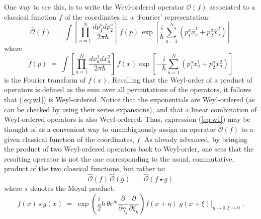 \documentclass[a4paper,12pt]{article}
\begin{document}
One way to see this, is to write the Weyl-ordered operator
${\mathcal
  O}(f)$ associated to a classical function $f$ of the coordinates
in
a `Fourier' representation:
\begin{equation}
  \label{eq:w1}
{\hat {\mathcal O}}(f)\;=\; \int [\prod_{a=1}^N \frac{dp_1^a
dp_2^a}{2\pi \hbar}]\,
{\tilde f}(p) \, \exp [ \frac{i}{\hbar} \sum_{a=1}^N (p_1^a {\hat
x}^1_a +
p_2^a {\hat x}^2_a)]
\end{equation}
where
\begin{equation}
  \label{eq:w2}
{\tilde f}(p) \;=\; \int [\prod_{a=1}^N \frac{dx^1_a dx^2_a}{2 \pi
\hbar}]\,
f(x) \exp [- \frac{i}{\hbar} \sum_{a=1}^N (p_1^a x^1_a +p_2^a
x^2_a) ]
\end{equation}
is the Fourier transform of $f(x)$. Recalling that the Weyl-order
of a
product of operators is defined as the sum over all permutations of
the operators, it follows that (\ref{eq:w1}) is Weyl-ordered.
Notice
that the exponentials are Weyl-ordered (as can be checked by using
their series expansions), and that a linear combination of
Weyl-ordered operators is also Weyl-ordered. Thus, expression
(\ref{eq:w1}) may be thought of as a convenient way to
unambiguously
assign an operator ${\hat{\mathcal O}}(f)$ to a given classical
function of the coordinates, $f$. As already advanced, by bringing
the
product of two Weyl-ordered operators back to Weyl-order, one sees
that the resulting operator is not the one corresponding to the
usual,
commutative, product of the two classical functions, but rather to:
\begin{equation}
  \label{eq:w3}
{\hat {\mathcal O}}(f) \, {\hat {\mathcal O}}(g) \;=\; 
{\hat {\mathcal O}}(f \star g )   
\end{equation} 
where $\star$ denotes the Moyal product:
\begin{equation}
  \label{eq:w4}
f(x) \star g (x) \;=\; \exp ( \frac{i}{2}\hbar \,\theta
\epsilon^{jk}
\frac{\partial}{\partial \eta_j} \frac{\partial}{\partial\xi_k})
f(x+\eta) \; g(x+\xi) |_{\eta \to 0, \xi \to 0} \;.
\end{equation}
\end{document}
